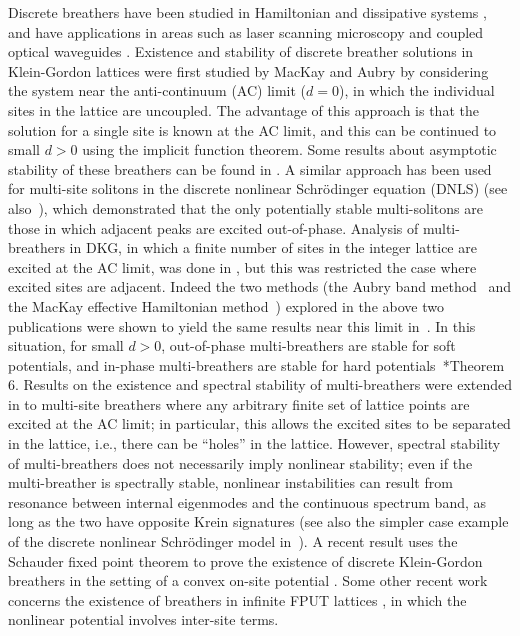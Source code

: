 \documentclass[12pt,reqno]{amsart}
\theoremstyle{definition}
\begin{document}
Discrete breathers have been studied in Hamiltonian \cite{Flach1998} and dissipative systems \cite{Flach2008a}, and have applications in areas such as laser scanning microscopy and coupled optical waveguides \cite{Flach2008,LEDERER20081}. Existence and stability of discrete breather solutions in Klein-Gordon lattices were first studied by MacKay and Aubry \cites{MacKay1994,Aubry1997} by considering the system near the anti-continuum (AC) limit ($d=0$), in which the individual sites in the lattice are uncoupled. The advantage of this approach is that the solution for a single site is known at the AC limit, and this can be continued to small $d>0$ using the implicit function theorem. Some results about asymptotic stability of these breathers can be found in \cite{Bambusi2013}. A similar approach has been used for multi-site solitons in the discrete nonlinear Schr\"odinger equation (DNLS) \cite{Pelinovsky2005} (see also~\cite{KALOSAKAS200644}), which demonstrated that the only 
potentially stable multi-solitons are those in which adjacent peaks are excited out-of-phase. Analysis of multi-breathers in DKG, in which a finite number of sites in the integer lattice are excited at the AC limit, was done in \cites{Archilla2003,Koukouloyannis2009}, but this was restricted the case where excited sites are adjacent.
Indeed the two methods (the Aubry band method~\cite{Aubry1997} and the MacKay
effective Hamiltonian method~\cite{sepulchre}) explored in the above two publications
were shown to yield the same results near this limit 
in~\cite{doi:10.1142/S0218127411029690}.
In this situation, for small $d>0$, out-of-phase multi-breathers are stable for soft potentials, and in-phase multi-breathers are stable for hard potentials~\cite{Archilla2003}*{Theorem 6}. Results on the existence and spectral stability of multi-breathers were extended in \cite{Pelinovsky2012} to multi-site breathers where any arbitrary finite set of lattice points are excited at the AC limit; in particular, this allows the excited sites to be separated in the lattice, i.e., there can be ``holes'' in the lattice. However, spectral stability of multi-breathers does not necessarily imply nonlinear stability; even if the multi-breather is spectrally stable, nonlinear instabilities can result from resonance between internal eigenmodes and the continuous spectrum band, as long as the two have opposite Krein signatures \cite{cuevas-maraver2016}
(see also the simpler case example of the discrete
nonlinear Schr{\"o}dinger model in~\cite{PhysRevLett.114.214101}). A recent result uses the Schauder fixed point theorem to prove the existence of discrete Klein-Gordon breathers in the setting of a convex on-site potential \cite{hennig2021}. Some other recent work concerns the existence of breathers in infinite FPUT lattices \cites{Arioli2019,yoshimura2021}, in which the nonlinear potential involves inter-site terms.
\end{document}
